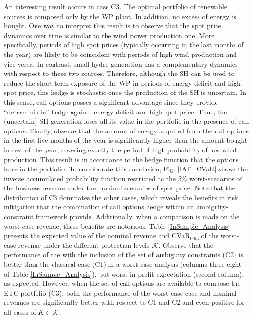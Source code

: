 	An interesting result occurs in case C3. The optimal portfolio of renewable sources is composed only by the WP plant. In addition, no excess of energy is bought. One way to interpret this result is to observe that the spot price dynamics over time is similar to the wind power production one. More specifically, periods of high spot prices (typically occurring in the last months of the year) are likely to be coincident with periods of high wind production and vice-versa. In contrast, small hydro generation has a complementary dynamics with respect to these two sources. Therefore, although the SH can be used to reduce the short-term exposure of the WP in periods of energy deficit and high spot price, this hedge is stochastic once the production of the SH is uncertain. In this sense, call options posses a significant advantage since they provide ``deterministic'' hedge against energy deficit and high spot price. Thus, the (uncertain) SH generation loses all its value in the portfolio in the presence of call options. Finally, observe that the amount of energy acquired from the call options in the first five months of the year is significantly higher than the amount bought in rest of the year, covering exactly the period of high probability of low wind production. This result is in accordance to the hedge function that the options have in the portfolio. To corroborate this conclusion, Fig. \ref{IAF_CVaR} shows the inverse accumulated probability function restricted to the 5\% worst-scenarios of the business revenue under the nominal scenarios of spot price. Note that the distribution of C3 dominates the other cases, which reveals the benefits in risk mitigation that the combination of call options hedge within an ambiguity-constraint framework provide. Additionally, when a comparison is made on the worst-case revenue, these benefits are notorious. Table \ref{InSample_Analysis} presents the expected value of the nominal revenue and $\text{CVaR}_{0.95}$ of the worst-case revenue under the different protection levels $\mathcal{K}$. Observe that the performance of the with the inclusion of the set of ambiguity constraints (C2) is better than the classical case (C1) in a worst-case analysis (columns three-eight of Table \ref{InSample_Analysis}), but worst in profit expectation (second column), as expected. However, when the set of call options are available to compose the ETC portfolio (C3), both the performance of the worst-case case and nominal revenues are significantly better with respect to C1 and C2 and even positive for all cases of $K \in \mathcal{K}$. 
%
